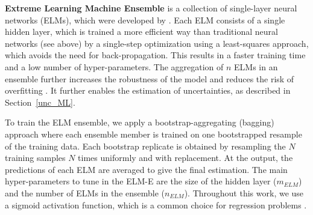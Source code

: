 \textbf{Extreme Learning Machine Ensemble } is a collection of single-layer neural networks (ELMs), which were developed by \citet{huang_extreme_2006}. Each ELM consists of a single hidden layer, which is trained a more efficient way than traditional neural networks (see above) by a single-step optimization using a least-squares approach, which avoids the need for back-propagation. This results in a faster training time and a low number of hyper-parameters. The aggregation of $n$ ELMs in an ensemble further increases the robustness of the model and reduces the risk of overfitting \cite{huang_trends_2015}. 
It further enables the estimation of uncertainties, as described in Section~\ref{unc_ML}.

To train the ELM ensemble, we apply a bootstrap-aggregating (bagging) approach \cite{breiman_bagging_1996} where each ensemble member is trained on one bootstrapped resample of the training data. Each bootstrap replicate is obtained by resampling the $N$ training samples $N$ times uniformly and with replacement. At the output, the predictions of each ELM are averaged to give the final estimation.
The main hyper-parameters to tune in the ELM-E are the size of the hidden layer ($m_{ELM}$) and the number of ELMs in the ensemble ($n_{ELM}$). Throughout this work, we use a sigmoid activation function, which is a common choice for regression problems \cite{huang_trends_2015}.



